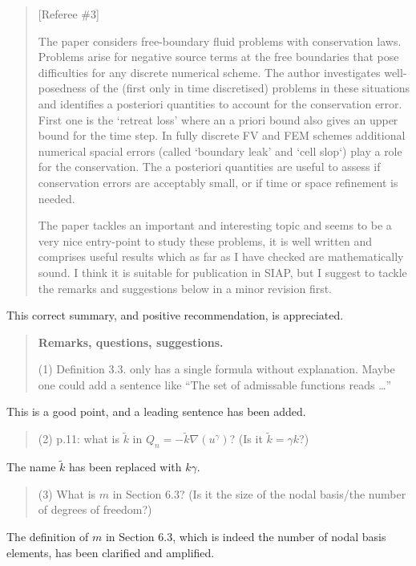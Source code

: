 \documentclass[12pt]{amsart}
\newcommand{\mm}{\medskip \noindent}
\begin{document}
\begin{quote}
[Referee \#3]

The paper considers free-boundary fluid problems with conservation laws. Problems arise for negative source terms at the free boundaries that pose difficulties for any discrete numerical scheme.  The author investigates well-posedness of the (first only in time discretised) problems in these situations and identifies a posteriori quantities to account for the conservation error.  First one is the `retreat loss' where an a priori bound also gives an upper bound for the time step.  In fully discrete FV and FEM schemes additional numerical spacial errors (called `boundary leak' and
`cell slop`) play a role for the conservation.  The a posteriori quantities are useful to assess if conservation errors are acceptably small, or if time or space refinement is needed.

\mm The paper tackles an important and interesting topic and seems to be a very nice entry-point to study these problems, it is well written and comprises useful results which as far as I have checked are mathematically sound.  I think it is suitable for publication in SIAP, but I suggest to tackle the remarks and suggestions below in a minor revision first.
\end{quote}

This correct summary, and positive recommendation, is appreciated.

\begin{quote}
\textbf{Remarks, questions, suggestions.}

\mm (1) Definition 3.3. only has a single formula without explanation. Maybe one could add a sentence like ``The set of admissable functions reads \dots''
\end{quote}

This is a good point, and a leading sentence has been added.

\begin{quote}
\mm (2) p.11: what is $\tilde k$ in $Q_n = - \tilde k\nabla(u^\gamma)$?  (Is it $\tilde k = \gamma k$?)
\end{quote}

The name $\tilde k$ has been replaced with $k \gamma$.

\begin{quote}
\mm (3) What is $m$ in Section 6.3? (Is it the size of the nodal basis/the number of degrees of freedom?)
\end{quote}

The definition of $m$ in Section 6.3, which is indeed the number of nodal basis elements, has been clarified and amplified.
\end{document}
